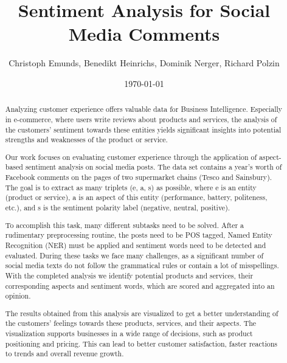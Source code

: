 \documentclass[10pt,a4paper]{article}
\title{{\Huge Sentiment Analysis for Social Media Comments}}
\author{Christoph Emunds, Benedikt Heinrichs, Dominik Nerger, Richard Polzin}
\date{\today}
\begin{document}
	\maketitle
	
	\begin{abstract}
	Analyzing customer experience offers valuable data for Business Intelligence. Especially in e-commerce, where users write reviews about products and services, the analysis of the customers' sentiment towards these entities yields significant insights into potential strengths and weaknesses of the product or service.

	Our work focuses on evaluating customer experience through the application of aspect-based sentiment analysis on social media posts. The data set contains a year's worth of Facebook comments on the pages of two supermarket chains (Tesco and Sainsbury). The goal is to extract as many triplets (e, a, s) as possible, where e is an entity (product or service), a is an aspect of this entity (performance, battery, politeness, etc.), and s is the sentiment polarity label (negative, neutral, positive).

	To accomplish this task, many different subtasks need to be solved. After a rudimentary preprocessing routine, the posts need to be POS tagged, Named Entity Recognition (NER) must be applied and sentiment words need to be detected and evaluated. During these tasks we face many challenges, as a significant number of social media texts do not follow the grammatical rules or contain a lot of misspellings. With the completed analysis we identify potential products and services, their corresponding aspects and sentiment words, which are scored and aggregated into an opinion.

	The results obtained from this analysis are visualized to get a better understanding of the customers' feelings towards these products, services, and their aspects. The visualization supports businesses in a wide range of decisions, such as product positioning and pricing. This can lead to better customer satisfaction, faster reactions to trends and overall revenue growth.
	\end{abstract}
	
	\newpage
	\tableofcontents
	\newpage
\end{document}
